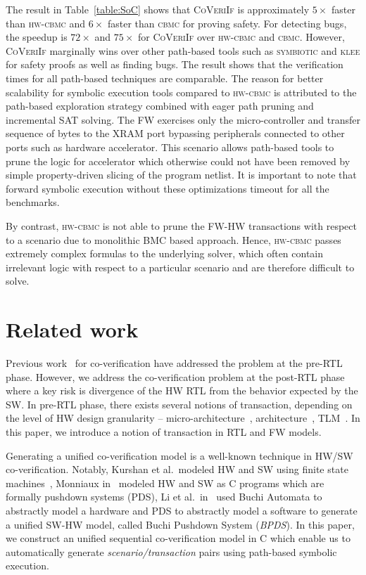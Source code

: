 \documentclass[sigconf]{acmart}
\newcommand{\tool}[1]{\textsc{#1}\xspace}
\newcommand{\cbmcv}{\tool{cbmc}}
\newcommand{\hwcbmcv}{\tool{hw-cbmc}}
\newcommand{\verifox}{\tool{CoVeriIf}}
\newcommand{\klee}{\tool{klee}}
\newcommand{\symbiotic}{\tool{symbiotic}}
\begin{document}
The result in Table~\ref{table:SoC} shows that \verifox is approximately
$5\times$ faster than \hwcbmcv and $6\times$ faster than \cbmcv for proving
safety.  For detecting bugs, the speedup is $72\times$ and $75\times$ for
\verifox over \hwcbmcv and \cbmcv.  However, \verifox marginally wins over
other path-based tools such as \symbiotic and \klee for safety proofs as
well as finding bugs. The result shows that the verification times for all
path-based techniques are comparable.  The reason for better scalability for
symbolic execution tools compared to \hwcbmcv is attributed to the path-based 
exploration strategy combined with eager path pruning and incremental SAT
solving. The FW exercises only the micro-controller
and transfer sequence of bytes to the XRAM port bypassing peripherals
connected to other ports such as hardware accelerator.  This scenario
allows path-based tools to prune the logic for accelerator which otherwise
could not have been removed by simple property-driven slicing of the
program netlist.  It is important to note that forward symbolic execution without
these optimizations timeout for all the benchmarks.

By contrast, \hwcbmcv is not able to prune the FW-HW transactions with
respect to a scenario due to monolithic BMC based approach.  Hence, \hwcbmcv
passes extremely complex formulas to the underlying solver, which often
contain irrelevant logic with respect to a particular scenario and are
therefore difficult to solve.

\section{Related work}

Previous work~\cite{codes14,codes15,fmcad13,memocode06} for 
co-verification have addressed the problem at the pre-RTL phase. 
However, we address the co-veri\-fi\-cation problem at the post-RTL
phase~\cite{fase10,vlsid13} where a key risk is divergence of the 
HW RTL from the behavior expected by the SW. In pre-RTL phase, 
there exists several notions of transaction, depending on the level 
of HW design granularity -- micro-architecture~\cite{mcbmq},
architecture~\cite{mcbmq}, TLM~\cite{tlm-book,hvc}. In this paper, 
we introduce a notion of transaction in RTL and FW models.      

Generating a unified co-verification model is a well-known 
technique in HW/SW co-verification.  Notably, Kurshan et al.~modeled HW and 
SW using finite state machines~\cite{fmsd02}, Monniaux in~\cite{emsoft07} modeled
HW and SW as C programs which are formally pushdown systems (PDS), 
Li et al.~in~\cite{fase10} used Buchi Automata to abstractly
model a hardware and PDS to abstractly model a software to generate a unified SW-HW model, 
called Buchi Pushdown System ({\em BPDS}).  In this paper, we construct an unified 
sequential co-verification model in C which enable us to automatically 
generate {\em scenario/transaction} pairs using path-based symbolic execution. 
\end{document}
